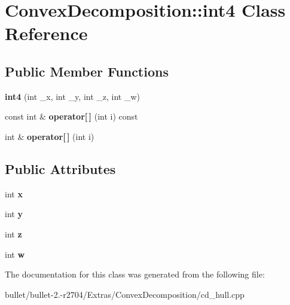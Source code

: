 \hypertarget{class_convex_decomposition_1_1int4}{\section{Convex\+Decomposition\+:\+:int4 Class Reference}
\label{class_convex_decomposition_1_1int4}
}
\subsection*{Public Member Functions}
\begin{DoxyCompactItemize}
\item 
\hypertarget{class_convex_decomposition_1_1int4_a10d04a5978ba30fe3bc0dfa504535b02}{{\bfseries int4} (int \+\_\+x, int \+\_\+y, int \+\_\+z, int \+\_\+w)}\label{class_convex_decomposition_1_1int4_a10d04a5978ba30fe3bc0dfa504535b02}

\item 
\hypertarget{class_convex_decomposition_1_1int4_a194fbb91b367a60287f398479815adb8}{const int \& {\bfseries operator\mbox{[}$\,$\mbox{]}} (int i) const }\label{class_convex_decomposition_1_1int4_a194fbb91b367a60287f398479815adb8}

\item 
\hypertarget{class_convex_decomposition_1_1int4_ae4623f49270ffb940a9e3233048cba47}{int \& {\bfseries operator\mbox{[}$\,$\mbox{]}} (int i)}\label{class_convex_decomposition_1_1int4_ae4623f49270ffb940a9e3233048cba47}

\end{DoxyCompactItemize}
\subsection*{Public Attributes}
\begin{DoxyCompactItemize}
\item 
\hypertarget{class_convex_decomposition_1_1int4_a6d5be27f9886536b9c44908f1ac3ea93}{int {\bfseries x}}\label{class_convex_decomposition_1_1int4_a6d5be27f9886536b9c44908f1ac3ea93}

\item 
\hypertarget{class_convex_decomposition_1_1int4_a0456d906616ed1ea178bb7debd0b2083}{int {\bfseries y}}\label{class_convex_decomposition_1_1int4_a0456d906616ed1ea178bb7debd0b2083}

\item 
\hypertarget{class_convex_decomposition_1_1int4_a7ce9dc0a4b2e51c27fc819d174b2fd78}{int {\bfseries z}}\label{class_convex_decomposition_1_1int4_a7ce9dc0a4b2e51c27fc819d174b2fd78}

\item 
\hypertarget{class_convex_decomposition_1_1int4_aa8fb3defbd553b6d15bde3f0a5f7e598}{int {\bfseries w}}\label{class_convex_decomposition_1_1int4_aa8fb3defbd553b6d15bde3f0a5f7e598}

\end{DoxyCompactItemize}


The documentation for this class was generated from the following file\+:\begin{DoxyCompactItemize}
\item 
bullet/bullet-\/2.-\/r2704/\+Extras/\+Convex\+Decomposition/cd\+\_\+hull.\+cpp\end{DoxyCompactItemize}

